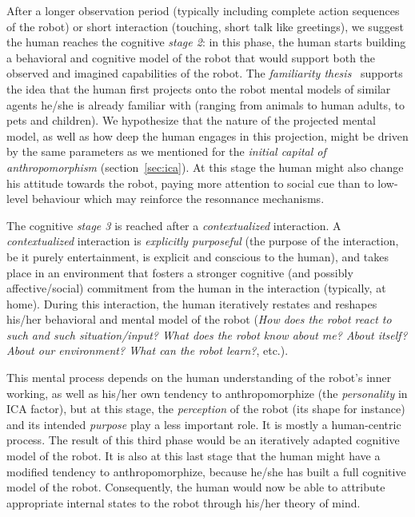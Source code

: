 \documentclass{frontiersSCNS} %
\begin{document}
After a longer observation period (typically including complete action sequences
of the robot) or short interaction (touching, short talk like greetings), we
suggest the human reaches the cognitive \emph{stage 2}: in this phase, the human
starts building a behavioral and cognitive model of the robot that would support
both the observed and imagined capabilities of the robot.  The \emph{familiarity
thesis}~\cite{hegel_understanding_2008} supports the idea that the human first
projects onto the robot mental models of similar agents he/she is already
familiar with (ranging from animals to human adults, to pets and children). We
hypothesize that the nature of the projected mental model, as well as how deep
the human engages in this projection, might be driven by the same parameters as
we mentioned for the \emph{initial capital of anthropomorphism}
(section~\ref{sec:ica}).  At this stage the human might also change his attitude
towards the robot, paying more attention to social cue than to low-level
behaviour which may reinforce the resonnance mechanisms. 

The cognitive \emph{stage 3} is reached after a \emph{contextualized} interaction.
A \emph{contextualized} interaction is \emph{explicitly purposeful} (the purpose
of the interaction, be it purely entertainment, is explicit and conscious to the
human), and takes place in an environment that fosters a stronger cognitive (and
possibly affective/social) commitment from the human in the interaction
(typically, at home). During this interaction, the human iteratively restates
and reshapes his/her behavioral and mental model of the robot (\emph{How does
the robot react to such and such situation/input?  What does the robot know
about me? About itself? About our environment? What can the robot learn?}, etc.).

This mental process depends on the human understanding of the robot's
inner working, as well as his/her own tendency to anthropomorphize (the
\emph{personality} in ICA factor), but at this
stage, the \emph{perception} of the robot (its shape for instance) and its
intended \emph{purpose} play a less important role. It is mostly a human-centric
process.  The result of this third phase would be an iteratively adapted
cognitive model of the robot. It is also at this last stage that the human might have a
modified tendency to anthropomorphize, because he/she has built a full cognitive
model of the robot. Consequently, the human would now be able to attribute appropriate internal states to the robot
through his/her theory of mind.
\end{document}
